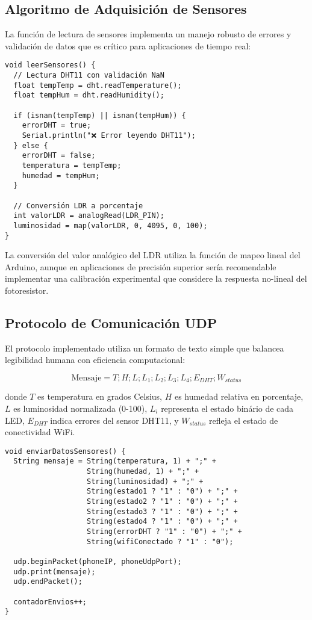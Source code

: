 \documentclass[conference,a4paper]{IEEEtran}
\begin{document}
\subsection{Algoritmo de Adquisici\'on de Sensores}

La funci\'on de lectura de sensores implementa un manejo robusto de errores y validaci\'on de datos que es cr\'itico para aplicaciones de tiempo real:

\begin{lstlisting}[style=arduino, caption=Implementaci\'on de lectura de sensores]
void leerSensores() {
  // Lectura DHT11 con validación NaN
  float tempTemp = dht.readTemperature();
  float tempHum = dht.readHumidity();
  
  if (isnan(tempTemp) || isnan(tempHum)) {
    errorDHT = true;
    Serial.println("❌ Error leyendo DHT11");
  } else {
    errorDHT = false;
    temperatura = tempTemp;
    humedad = tempHum;
  }
  
  // Conversión LDR a porcentaje
  int valorLDR = analogRead(LDR_PIN);
  luminosidad = map(valorLDR, 0, 4095, 0, 100);
}
\end{lstlisting}

La conversi\'on del valor anal\'ogico del LDR utiliza la funci\'on de mapeo lineal del Arduino, aunque en aplicaciones de precisi\'on superior ser\'ia recomendable implementar una calibraci\'on experimental que considere la respuesta no-lineal del fotoresistor.

\subsection{Protocolo de Comunicaci\'on UDP}

El protocolo implementado utiliza un formato de texto simple que balancea legibilidad humana con eficiencia computacional:

\begin{equation}
\text{Mensaje} = T;H;L;L_1;L_2;L_3;L_4;E_{DHT};W_{status}
\end{equation}

donde $T$ es temperatura en grados Celsius, $H$ es humedad relativa en porcentaje, $L$ es luminosidad normalizada (0-100), $L_i$ representa el estado bin\'ario de cada LED, $E_{DHT}$ indica errores del sensor DHT11, y $W_{status}$ refleja el estado de conectividad WiFi.

\begin{lstlisting}[style=arduino, caption=Formateado y transmisi\'on de datos]
void enviarDatosSensores() {
  String mensaje = String(temperatura, 1) + ";" +
                   String(humedad, 1) + ";" +
                   String(luminosidad) + ";" +
                   String(estado1 ? "1" : "0") + ";" +
                   String(estado2 ? "1" : "0") + ";" +
                   String(estado3 ? "1" : "0") + ";" +
                   String(estado4 ? "1" : "0") + ";" +
                   String(errorDHT ? "1" : "0") + ";" +
                   String(wifiConectado ? "1" : "0");
  
  udp.beginPacket(phoneIP, phoneUdpPort);
  udp.print(mensaje);
  udp.endPacket();
  
  contadorEnvios++;
}
\end{lstlisting}
\end{document}

